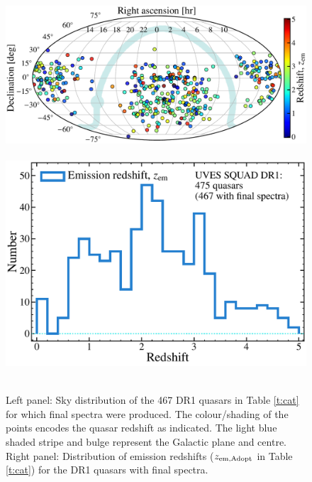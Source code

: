\documentclass[fleqn,usenatbib,usedcolumn]{mnras}
\newcommand{\Tref}[1]{Table \ref{#1}}
\begin{document}
\begin{figure}
\begin{center}
\centerline{\hbox{
    \includegraphics[width=1.16\columnwidth]{DR1_skymap.pdf}
    \hspace{0.01\columnwidth}
    \includegraphics[width=0.83\columnwidth]{DR1_zemdist.pdf}
}}
\caption{Left panel: Sky distribution of the 467 DR1 quasars in \Tref{t:cat} for which final spectra were produced. The colour/shading of the points encodes the quasar redshift as indicated. The light blue shaded stripe and bulge represent the Galactic plane and centre. Right panel: Distribution of emission redshifts ($z_{\rm em,Adopt}$ in \Tref{t:cat}) for the DR1 quasars with final spectra.}
\label{f:sky+zem}
\end{center}
\end{figure}
\end{document}
